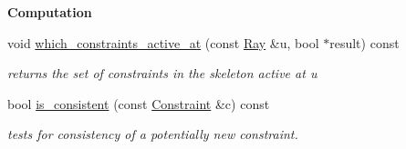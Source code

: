 \begin{Indent}\textbf{ Computation}\par
\begin{DoxyCompactItemize}
\item 
\mbox{\label{group___c_l_s_solvers_ac6e9aadc18f4f7e0d3860682cae3bdf7}} 
void \hyperlink{group___c_l_s_solvers_ac6e9aadc18f4f7e0d3860682cae3bdf7}{which\+\_\+constraints\+\_\+active\+\_\+at} (const \hyperlink{group___c_l_s_solvers_class_l_p___solvers_1_1_ray}{Ray} \&u, bool $\ast$result) const
\begin{DoxyCompactList}\small\item\em returns the set of constraints in the skeleton active at {\ttfamily u} \end{DoxyCompactList}\item 
\mbox{\label{group___c_l_s_solvers_a97d4c6e4864a90140728d664c8de12cf}} 
bool \hyperlink{group___c_l_s_solvers_a97d4c6e4864a90140728d664c8de12cf}{is\+\_\+consistent} (const \hyperlink{group___c_l_s_solvers_class_l_p___solvers_1_1_constraint}{Constraint} \&c) const
\begin{DoxyCompactList}\small\item\em tests for consistency of a potentially new constraint. \end{DoxyCompactList}\end{DoxyCompactItemize}
\end{Indent}
